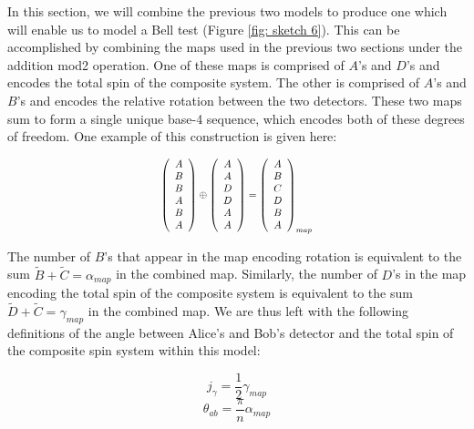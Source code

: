 \documentclass{article}
\begin{document}
In this section, we will combine the previous two models to produce one which will enable us to model a Bell test (Figure \ref{fig: sketch 6}). This can be accomplished by combining the maps used in the previous two sections under the addition mod2 operation. One of these maps is comprised of $A$'s and $D$'s and encodes the total spin of the composite system. The other is comprised of $A$'s  and $B$'s and encodes the relative rotation between the two detectors. These two maps sum to form a single unique base-4 sequence, which encodes both of these degrees of freedom. One example of this construction is given here:

\begin{equation}
\scalebox{0.8}{$\begin{aligned}
\left(\begin{array}{c}
A\\
B\\
B\\
A\\
B\\
A
\end{array}\right)\oplus\left(\begin{array}{c}
A\\
A\\
D\\
D\\
A\\
A
\end{array}\right)=\left(\begin{array}{c}
A\\
B\\
C\\
D\\
B\\
A
\end{array}\right)_{map}\label{eq: Bell rotation map}
\end{aligned}$}
\end{equation}

The number of $B$'s that appear in the map encoding rotation is equivalent to the sum $\tilde{B}+\tilde{C}=\alpha_{map}$ in the combined map. Similarly, the number of $D$'s in the map encoding the total spin of the composite system is equivalent to the sum $\tilde{D}+\tilde{C}=\gamma_{map}$ in the combined map. We are thus left with the following definitions of the angle between Alice's and Bob's detector and the total spin of the composite spin system within this model:


\begin{equation}
    j_{\gamma}=\frac{1}{2}\gamma_{map}
\end{equation}
\begin{equation}
    \theta_{ab}=\frac{\pi}{n}\alpha_{map}
    \label{eq: theta ab}
\end{equation}
\end{document}
